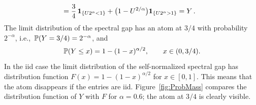 \begin{example}
\begin{equation*}
\begin{split}
& =\dfrac{3}{4}\,  \1_{\{U 2^{\alpha }<1\}}+
\big(1-U^{2/\alpha}\big)\1_{\{U2^{\alpha
  }> 1\}}=Y\,.
\end{split}
\end{equation*}
The limit  distribution of the spectral gap
has an atom at $3/4$ with probability $2^{-\alpha}$, i.e.,~$\P(Y=3/4)=2^{-\alpha}$, and
\begin{equation*}
\P(Y\le x)= 1- (1-x)^{\alpha/2},\qquad x\in (0,3/4).
\end{equation*}
In the iid case the limit distribution of the self-normalized spectral gap has distribution function $F(x) = 1- (1-x)^{\alpha/2}$ for $x\in [0,1]$. This means that the atom disappears if the entries are iid. Figure~\ref{fig:ProbMass} compares the distribution function of $Y$
with $F$ for $\alpha=0.6$; the atom at $3/4$ is clearly visible.


\end{example}
